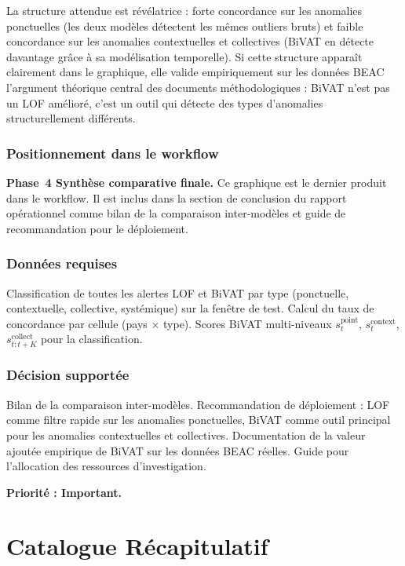 \documentclass[12pt,a4paper]{article}
\begin{document}
La structure attendue est révélatrice : forte concordance sur les anomalies
ponctuelles (les deux modèles détectent les mêmes outliers bruts) et faible
concordance sur les anomalies contextuelles et collectives (BiVAT en
détecte davantage grâce à sa modélisation temporelle). Si cette structure
apparaît clairement dans le graphique, elle valide empiriquement sur les
données BEAC l'argument théorique central des documents méthodologiques :
BiVAT n'est pas un LOF amélioré, c'est un outil qui détecte des types
d'anomalies structurellement différents.

\subsubsection{Positionnement dans le workflow}

\textbf{Phase~4  Synthèse comparative finale.} Ce graphique est le
dernier produit dans le workflow. Il est inclus dans la section de conclusion
du rapport opérationnel comme bilan de la comparaison inter-modèles et
guide de recommandation pour le déploiement.

\subsubsection{Données requises}

Classification de toutes les alertes LOF et BiVAT par type (ponctuelle,
contextuelle, collective, systémique) sur la fenêtre de test. Calcul du
taux de concordance par cellule (pays × type). Scores BiVAT multi-niveaux
$s^{\mathrm{point}}_t$, $s^{\mathrm{context}}_t$,
$s^{\mathrm{collect}}_{t:t+K}$ pour la classification.

\subsubsection{Décision supportée}

Bilan de la comparaison inter-modèles. Recommandation de déploiement :
LOF comme filtre rapide sur les anomalies ponctuelles, BiVAT comme outil
principal pour les anomalies contextuelles et collectives.
Documentation de la valeur ajoutée empirique de BiVAT sur les données
BEAC réelles. Guide pour l'allocation des ressources d'investigation.

\textbf{Priorité : Important.}

\section{Catalogue Récapitulatif}
\end{document}
